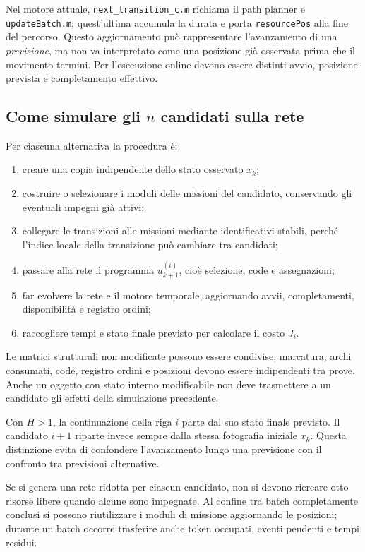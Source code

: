 \documentclass[a4paper,11pt]{article}
\begin{document}
Nel motore attuale, \texttt{next\_transition\_c.m} richiama il path planner e \texttt{updateBatch.m}; quest'ultima accumula la durata e porta \texttt{resourcePos} alla fine del percorso. Questo aggiornamento può rappresentare l'avanzamento di una \emph{previsione}, ma non va interpretato come una posizione già osservata prima che il movimento termini. Per l'esecuzione online devono essere distinti avvio, posizione prevista e completamento effettivo.

\subsection{Come simulare gli $n$ candidati sulla rete}

Per ciascuna alternativa la procedura è:
\begin{enumerate}
    \item creare una copia indipendente dello stato osservato $x_k$;
    \item costruire o selezionare i moduli delle missioni del candidato, conservando gli eventuali impegni già attivi;
    \item collegare le transizioni alle missioni mediante identificativi stabili, perché l'indice locale della transizione può cambiare tra candidati;
    \item passare alla rete il programma $u_{k+1}^{(i)}$, cioè selezione, code e assegnazioni;
    \item far evolvere la rete e il motore temporale, aggiornando avvii, completamenti, disponibilità e registro ordini;
    \item raccogliere tempi e stato finale previsto per calcolare il costo $J_i$.
\end{enumerate}

Le matrici strutturali non modificate possono essere condivise; marcatura, archi consumati, code, registro ordini e posizioni devono essere indipendenti tra prove. Anche un oggetto con stato interno modificabile non deve trasmettere a un candidato gli effetti della simulazione precedente.

Con $H>1$, la continuazione della riga $i$ parte dal suo stato finale previsto. Il candidato $i+1$ riparte invece sempre dalla stessa fotografia iniziale $x_k$. Questa distinzione evita di confondere l'avanzamento lungo una previsione con il confronto tra previsioni alternative.

Se si genera una rete ridotta per ciascun candidato, non si devono ricreare otto risorse libere quando alcune sono impegnate. Al confine tra batch completamente conclusi si possono riutilizzare i moduli di missione aggiornando le posizioni; durante un batch occorre trasferire anche token occupati, eventi pendenti e tempi residui.
\end{document}
